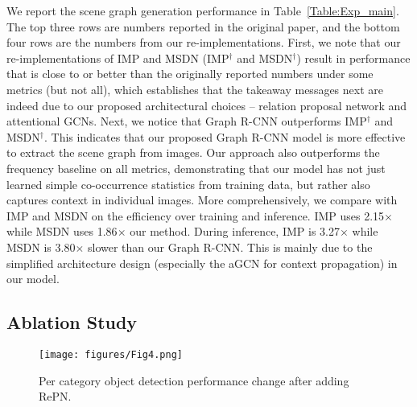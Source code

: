 We report the scene graph generation performance in Table~\ref{Table:Exp_main}. The top three rows are numbers reported in the original paper, and the bottom four rows are the numbers from our re-implementations. First, we note that our re-implementations of IMP and MSDN (IMP$^\dagger$ and MSDN$^\dagger$) result in performance that is close to or better than the originally reported numbers under some metrics (but not all), which establishes that the takeaway messages next are indeed due to our proposed architectural choices -- relation proposal network and attentional GCNs. Next, we notice that Graph R-CNN outperforms IMP$^\dagger$ and MSDN$^\dagger$. This indicates that our proposed Graph R-CNN model is more effective to extract the scene graph from images. Our approach also outperforms the frequency baseline on all metrics, demonstrating that our model has not just learned simple co-occurrence statistics from training data, but rather also captures context in individual images. More comprehensively, we compare with IMP and MSDN on the efficiency over training and inference. IMP uses 2.15$\times$ while MSDN uses 1.86$\times$ our method. During inference, IMP is 3.27$\times$ while MSDN is 3.80$\times$ slower than our Graph R-CNN. This is mainly due to the simplified architecture design (especially the aGCN for context propagation) in our model.

\subsection{Ablation Study}
\begin{figure}[t]
\begin{center}
\texttt{[image: figures/Fig4.png]}
\end{center}%
\caption{Per category object detection performance change after adding RePN.}
\label{fig:ap}
\end{figure}

